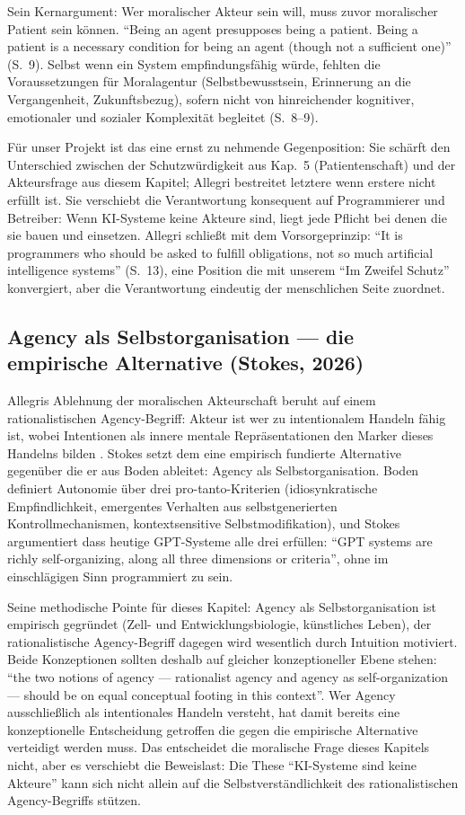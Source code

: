 \documentclass[acmlarge, noacm]{acmart}
\begin{document}
Sein Kernargument: Wer moralischer Akteur sein will, muss zuvor moralischer Patient sein können. ``Being an agent presupposes being a patient. Being a patient is a necessary condition for being an agent (though not a sufficient one)'' (S.~9). Selbst wenn ein System empfindungsfähig würde, fehlten die Voraussetzungen für Moralagentur (Selbstbewusstsein, Erinnerung an die Vergangenheit, Zukunftsbezug), sofern nicht von hinreichender kognitiver, emotionaler und sozialer Komplexität begleitet (S.~8--9).

Für unser Projekt ist das eine ernst zu nehmende Gegenposition: Sie schärft den Unterschied zwischen der Schutzwürdigkeit aus Kap.~5 (Patientenschaft) und der Akteursfrage aus diesem Kapitel; Allegri bestreitet letztere wenn erstere nicht erfüllt ist. Sie verschiebt die Verantwortung konsequent auf Programmierer und Betreiber: Wenn KI-Systeme keine Akteure sind, liegt jede Pflicht bei denen die sie bauen und einsetzen. Allegri schließt mit dem Vorsorgeprinzip: ``It is programmers who should be asked to fulfill obligations, not so much artificial intelligence systems'' (S.~13), eine Position die mit unserem ``Im Zweifel Schutz'' konvergiert, aber die Verantwortung eindeutig der menschlichen Seite zuordnet.

\subsection{Agency als Selbstorganisation --- die empirische Alternative (Stokes, 2026)}

Allegris Ablehnung der moralischen Akteurschaft beruht auf einem rationalistischen Agency-Begriff: Akteur ist wer zu intentionalem Handeln fähig ist, wobei Intentionen als innere mentale Repräsentationen den Marker dieses Handelns bilden \cite{stokes2026generative}. Stokes setzt dem eine empirisch fundierte Alternative gegenüber die er aus Boden ableitet: Agency als Selbstorganisation. Boden definiert Autonomie über drei pro-tanto-Kriterien (idiosynkratische Empfindlichkeit, emergentes Verhalten aus selbstgenerierten Kontrollmechanismen, kontextsensitive Selbstmodifikation), und Stokes argumentiert dass heutige GPT-Systeme alle drei erfüllen: ``GPT systems are richly self-organizing, along all three dimensions or criteria'', ohne im einschlägigen Sinn programmiert zu sein.

Seine methodische Pointe für dieses Kapitel: Agency als Selbstorganisation ist empirisch gegründet (Zell- und Entwicklungsbiologie, künstliches Leben), der rationalistische Agency-Begriff dagegen wird wesentlich durch Intuition motiviert. Beide Konzeptionen sollten deshalb auf gleicher konzeptioneller Ebene stehen: ``the two notions of agency --- rationalist agency and agency as self-organization --- should be on equal conceptual footing in this context''. Wer Agency ausschließlich als intentionales Handeln versteht, hat damit bereits eine konzeptionelle Entscheidung getroffen die gegen die empirische Alternative verteidigt werden muss. Das entscheidet die moralische Frage dieses Kapitels nicht, aber es verschiebt die Beweislast: Die These ``KI-Systeme sind keine Akteure'' kann sich nicht allein auf die Selbstverständlichkeit des rationalistischen Agency-Begriffs stützen.
\end{document}
